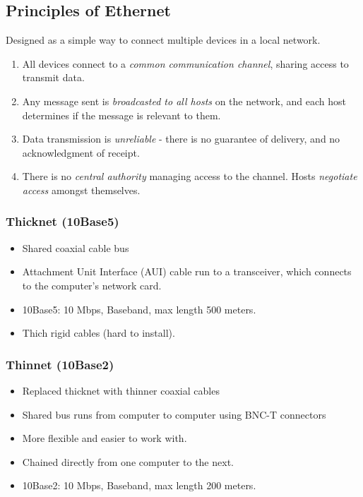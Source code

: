 \documentclass{article}
\begin{document}
\subsection*{Principles of Ethernet}
Designed as a simple way to connect multiple devices in a local network.
\begin{enumerate}
    \item All devices connect to a \emph{common communication channel}, sharing
          access to transmit data.
    \item Any message sent is \emph{broadcasted to all hosts} on the network,
          and each host determines if the message is relevant to them.
    \item Data transmission is \emph{unreliable} - there is no guarantee of
          delivery, and no acknowledgment of receipt.
    \item There is no \emph{central authority} managing access to the channel.
          Hosts \emph{negotiate access} amongst themselves.
\end{enumerate}

\subsubsection*{Thicknet (10Base5)}
\begin{itemize}
    \item Shared coaxial cable bus
    \item Attachment Unit Interface (AUI) cable run to a transceiver, which
          connects to the computer's network card.
    \item 10Base5: 10 Mbps, Baseband, max length 500 meters.
    \item Thich rigid cables (hard to install).
\end{itemize}

\subsubsection*{Thinnet (10Base2)}
\begin{itemize}
    \item Replaced thicknet with thinner coaxial cables
    \item Shared bus runs from computer to computer using BNC-T connectors
    \item More flexible and easier to work with.
    \item Chained directly from one computer to the next.
    \item 10Base2: 10 Mbps, Baseband, max length 200 meters.
\end{itemize}
\end{document}
